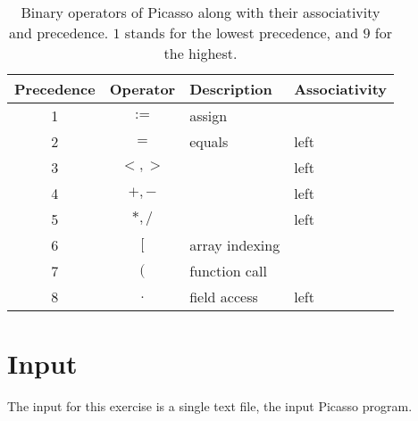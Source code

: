 \documentclass{article}
\begin{document}
\begin{table}[h]
\centering
\begin{tabular}{ |c|c|l|l| }
\hline
Precedence & Operator & Description & Associativity \\
\hline
\hline
1          & $:=$            & assign         &       \\
\hline
2          & $=$             & equals         & left  \\
\hline
3          & $<,>$           &                & left  \\
\hline
4          & $+,-$           &                & left  \\
\hline
5          & $*,/$           &                & left  \\
\hline
6          & $[$             & array indexing &       \\
\hline
7          & $($             & function call  &       \\
\hline
8          & $.$     & field access   & left          \\
\hline
\end{tabular}
\caption{
Binary operators of Picasso along with their associativity and precedence.
$1$ stands for the lowest precedence, and $9$ for the highest.
\label{Table_Binary_Operators_Of_Picasso}}
\end{table}

\section{Input}
The input for this exercise is a single text file, the input Picasso program.
\end{document}
